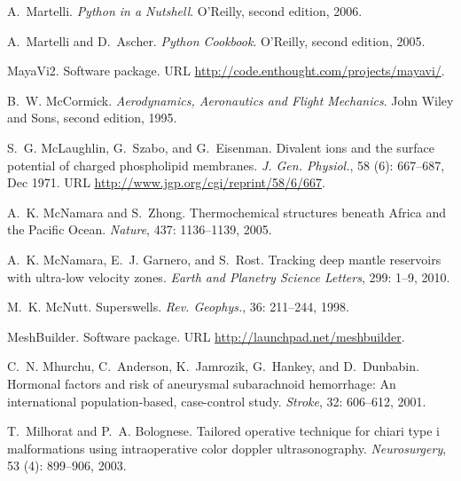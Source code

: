 \begin{thebibliography}{467}
A.~Martelli.
\newblock \emph{Python in a Nutshell}.
\newblock O'Reilly, second edition, 2006.

A.~Martelli and D.~Ascher.
\newblock \emph{Python Cookbook}.
\newblock O'Reilly, second edition, 2005.

{MayaVi2}.
\newblock Software package.
\newblock URL \url{http://code.enthought.com/projects/mayavi/}.

B.~W. McCormick.
\newblock \emph{Aerodynamics, Aeronautics and Flight Mechanics}.
\newblock John Wiley and Sons, second edition, 1995.

S.~G. McLaughlin, G.~Szabo, and G.~Eisenman.
\newblock Divalent ions and the surface potential of charged phospholipid
  membranes.
\newblock \emph{J. Gen. Physiol.}, 58 (6): 667--687, Dec
  1971.
\newblock URL \url{http://www.jgp.org/cgi/reprint/58/6/667}.

A.~K. McNamara and S.~Zhong.
\newblock Thermochemical structures beneath {A}frica and the {P}acific {O}cean.
\newblock \emph{Nature}, 437: 1136--1139, 2005.

A.~K. McNamara, E.~J. Garnero, and S.~Rost.
\newblock Tracking deep mantle reservoirs with ultra-low velocity zones.
\newblock \emph{Earth and Planetry Science Letters}, 299: 1--9, 2010.

M.~K. McNutt.
\newblock Superswells.
\newblock \emph{Rev. Geophys.}, 36: 211--244, 1998.

MeshBuilder.
\newblock Software package.
\newblock URL \url{http://launchpad.net/meshbuilder}.

C.~N. Mhurchu, C.~Anderson, K.~Jamrozik, G.~Hankey, and D.~Dunbabin.
\newblock Hormonal factors and risk of aneurysmal subarachnoid hemorrhage: An
  international population-based, case-control study.
\newblock \emph{Stroke}, 32: 606--612, 2001.

T.~Milhorat and P.~A. Bolognese.
\newblock Tailored operative technique for chiari type i malformations using
  intraoperative color doppler ultrasonography.
\newblock \emph{Neurosurgery}, 53 (4): 899--906, 2003.


\end{thebibliography}
